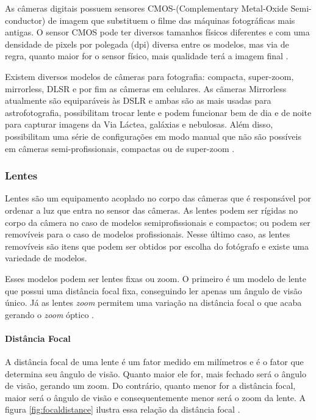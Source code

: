 As câmeras digitais possuem sensores CMOS-(Complementary Metal-Oxide Semi-conductor) de imagem que substituem o filme das máquinas fotográficas mais antigas. O sensor CMOS pode ter diversos tamanhos físicos diferentes e com uma densidade de pixels por polegada (dpi) diversa entre os modelos, mas via de regra, quanto maior for o sensor físico, mais qualidade terá a imagem final \cite{man:vanessacameras}.

Existem diversos modelos de câmeras para fotografia: compacta, super-zoom, mirrorless, DLSR e por fim as câmeras em celulares. As cãmeras Mirrorless atualmente são equiparáveis às DSLR e ambas são as mais usadas para astrofotografia, possibilitam trocar lente e podem funcionar bem de dia e de noite para capturar imagens da Via Láctea, galáxias e nebulosas. Além disso, possibilitam uma série de configurações em modo manual que não são possíveis em câmeras semi-profissionais, compactas ou de super-zoom \cite{book:bbcsky}.

\subsubsection{Lentes}

Lentes são um equipamento acoplado no corpo das câmeras que é responsável por ordenar a luz que entra no sensor das câmeras. As lentes podem ser rígidas no corpo da câmera no caso de modelos semiprofissionais e compactos; ou podem ser removíveis para o caso de modelos profissionais. Nesse último caso, as lentes removíveis são itens que podem ser obtidos por escolha do fotógrafo e existe uma variedade de modelos.

Esses modelos podem ser lentes fixas ou zoom. O primeiro é um modelo de lente que possui uma distância focal fixa, conseguindo ler apenas um ângulo de visão único. Já as lentes \textit{zoom} permitem uma variação na distância focal o que acaba gerando o \textit{zoom} óptico \cite{man:claudia7licoes}. 

\paragraph{Distância Focal}

A distância focal de uma lente é um fator medido em milímetros e é o fator que determina seu ângulo de visão. Quanto maior ele for, mais fechado será o ângulo de visão, gerando um zoom. Do contrário, quanto menor for a distância focal, maior será o ângulo de visão e consequentemente menor será o zoom da lente. A figura \ref{fig:focaldistance} ilustra essa relação da distância focal \cite{man:claudia7licoes}.

